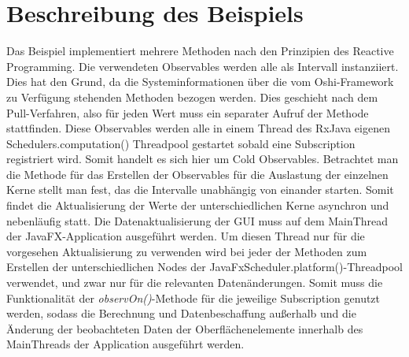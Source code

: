 \section{Beschreibung des Beispiels}
Das Beispiel implementiert mehrere Methoden nach den Prinzipien des Reactive Programming. Die verwendeten Observables werden alle als Intervall instanziiert. Dies hat den Grund, da die Systeminformationen über die vom Oshi-Framework zu Verfügung stehenden Methoden bezogen werden. Dies geschieht nach dem Pull-Verfahren, also für jeden Wert muss ein separater Aufruf der Methode stattfinden. Diese Observables werden alle in einem Thread des RxJava eigenen Schedulers.computation() Threadpool gestartet sobald eine Subscription registriert wird. Somit handelt es sich hier um Cold Observables. Betrachtet man die Methode für das Erstellen der Observables für die Auslastung der einzelnen Kerne stellt man fest, das die Intervalle unabhängig von einander starten. Somit findet die Aktualisierung der Werte der unterschiedlichen Kerne asynchron und nebenläufig statt. Die Datenaktualisierung der GUI muss auf dem MainThread der JavaFX-Application ausgeführt werden. Um diesen Thread nur für die vorgesehen Aktualisierung zu verwenden wird bei jeder der Methoden zum Erstellen der unterschiedlichen Nodes der JavaFxScheduler.platform()-Threadpool verwendet, und zwar nur für die relevanten Datenänderungen. Somit muss die Funktionalität der \textit{observOn()}-Methode für die jeweilige Subscription genutzt werden, sodass die Berechnung und Datenbeschaffung außerhalb und die Änderung der beobachteten Daten der Oberflächenelemente innerhalb des MainThreads der Application ausgeführt werden. 
